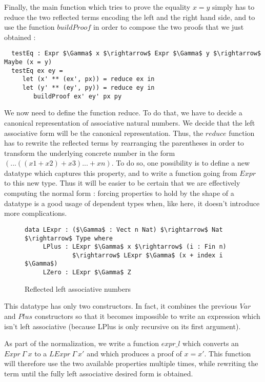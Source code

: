 Finally, the main function which tries to prove the equality $x=y$ simply has to reduce the two reflected terms encoding the left and the right hand side, and to use the function $buildProof$ in order to compose the two proofs that we just obtained :


\begin{lstlisting}
  testEq : Expr $\Gamma$ x $\rightarrow$ Expr $\Gamma$ y $\rightarrow$ Maybe (x = y)
  testEq ex ey = 
     let (x' ** (ex', px)) = reduce ex in 
     let (y' ** (ey', py)) = reduce ey in
        buildProof ex' ey' px py 
\end{lstlisting}


We now need to define the function reduce. To do that, we have to decide a canonical representation of associative natural numbers. We decide that the left associative form will be the canonical representation. Thus, the $reduce$ function has to rewrite the reflected terms by rearranging the parentheses in order to transform the underlying concrete number in the form $(...((x1 + x2) + x3) ... + xn)$. To do so, one possibility is to define a new datatype which captures this property, and to write a function going from $Expr$ to this new type. Thus it will be easier to be certain that we are effectively computing the normal form : forcing properties to hold by the shape of a datatype is a good usage of dependent types when, like here, it doesn't introduce more complications.

\begin{figure}[H]
\figrule
\begin{center}
\begin{lstlisting}
data LExpr : ($\Gamma$ : Vect n Nat) $\rightarrow$ Nat $\rightarrow$ Type where
     LPlus : LExpr $\Gamma$ x $\rightarrow$ (i : Fin n) 
             $\rightarrow$ LExpr $\Gamma$ (x + index i $\Gamma$)
     LZero : LExpr $\Gamma$ Z
\end{lstlisting}
\end{center}
\caption{Reflected left associative numbers}
\label{LExpr}
\figrule
\end{figure}

This datatype has only two constructors. In fact, it combines the previous $Var$ and $Plus$ constructors so that it becomes impossible to write an expression which isn't left associative (because LPlus is only recursive on its first argument).
 
As part of the normalization, we write a function $expr\_l$ which converts an $Expr\ \Gamma\ x$ to a $LExpr\ \Gamma\ x'$ and which produces a proof of $x=x'$. This function will therefore use the two available properties multiple times, while rewriting the term until the fully left associative desired form is obtained.


